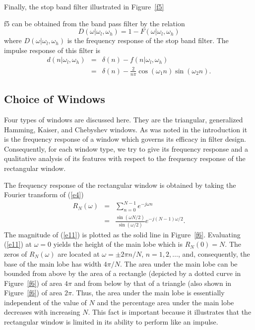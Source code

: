 	Finally, the stop band filter illustrated in Figure~\ref{f5}
%

{f5}
%
can be obtained from the band pass filter by the relation
%
\begin{equation}
D(\omega|\omega_l,\omega_h)=1-F(\omega|\omega_l,\omega_h)
\label{e9}
\end{equation}
%
where $D(\omega|\omega_l,\omega_h)$ is the frequency response of the stop
band filter.  The impulse response of this filter is
%
\begin{eqnarray}
d(n|\omega_l,\omega_h) &=& \delta(n)-f(n|\omega_l,\omega_h) \\
                       &=& \delta(n)-\frac{2}{n\pi}\cos(\omega_1n)\sin(\omega_2n).
\label{e10}
\end{eqnarray}
%
\subsection{Choice of Windows}
\label{s3}

Four types of windows are discussed
here.  They are the triangular, generalized Hamming,
Kaiser, and Chebyshev windows.  As was noted in the introduction it is the
frequency response of  a window
which governs its efficacy in filter design.  Consequently, for
each window type, we try to give its frequency response and a
qualitative analysis of its features with respect to the frequency 
response of the rectangular window.

	The frequency response of the rectangular window
 is obtained
by taking the Fourier transform of (\ref{e4})
%
\begin{eqnarray}
R_N(\omega) &=& \sum_{n=0}^{N-1}e^{-j\omega n} \\
            &=& \frac{\sin(\omega N/2)}{\sin(\omega/2)}e^{-j(N-1)\omega/2}.
\label{e11}
\end{eqnarray}
%
The magnitude of (\ref{e11}) is plotted as the solid line in Figure~\ref{f6}.
Evaluating (\ref{e11}) at $\omega=0$ yields the height of the 
main lobe which is $R_N(0)=N$.  The zeros of $R_N(\omega)$ are
located at $\omega=\pm2\pi n/N$, $n=1,2,\ldots$, and, consequently,
the base of the main lobe has width $4\pi/N$.  The area
under the main lobe can be bounded from above by the area of a
rectangle (depicted by a dotted curve in Figure~\ref{f6})
of area $4\pi$ and from
below by that of a triangle (also shown in Figure~\ref{f6}) of area $2\pi$.
Thus, the area under the main lobe is essentially independent
of the value of $N$ and the percentage area under the 
main lobe decreases with increasing $N$.  This fact is
important  because it illustrates 
that the rectangular window is limited
in its ability to perform like an impulse.

